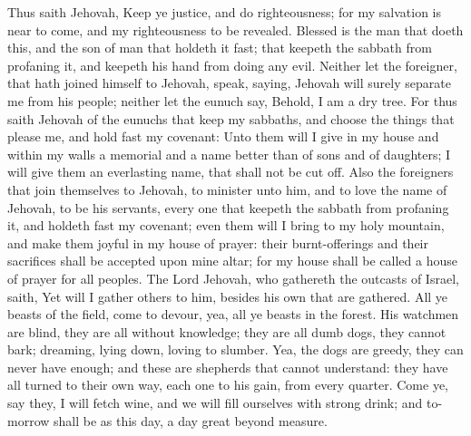 Thus saith Jehovah, Keep ye justice, and do righteousness; for my salvation is near to come, and my righteousness to be revealed. Blessed is the man that doeth this, and the son of man that holdeth it fast; that keepeth the sabbath from profaning it, and keepeth his hand from doing any evil. Neither let the foreigner, that hath joined himself to Jehovah, speak, saying, Jehovah will surely separate me from his people; neither let the eunuch say, Behold, I am a dry tree. For thus saith Jehovah of the eunuchs that keep my sabbaths, and choose the things that please me, and hold fast my covenant: Unto them will I give in my house and within my walls a memorial and a name better than of sons and of daughters; I will give them an everlasting name, that shall not be cut off.  Also the foreigners that join themselves to Jehovah, to minister unto him, and to love the name of Jehovah, to be his servants, every one that keepeth the sabbath from profaning it, and holdeth fast my covenant; even them will I bring to my holy mountain, and make them joyful in my house of prayer: their burnt-offerings and their sacrifices shall be accepted upon mine altar; for my house shall be called a house of prayer for all peoples. The Lord Jehovah, who gathereth the outcasts of Israel, saith, Yet will I gather others to him, besides his own that are gathered.  All ye beasts of the field, come to devour, yea, all ye beasts in the forest. His watchmen are blind, they are all without knowledge; they are all dumb dogs, they cannot bark; dreaming, lying down, loving to slumber. Yea, the dogs are greedy, they can never have enough; and these are shepherds that cannot understand: they have all turned to their own way, each one to his gain, from every quarter. Come ye, say they, I will fetch wine, and we will fill ourselves with strong drink; and to-morrow shall be as this day, a day great beyond measure. 

